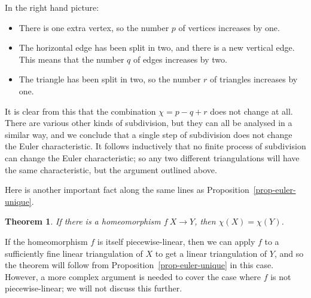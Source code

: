 \documentclass[reqno]{amsart}
\newtheorem{theorem}{Theorem}[section]
\theoremstyle{definition}
\begin{document}
\begin{center}
\end{center}

In the right hand picture:
\begin{itemize}
 \item There is one extra vertex, so the number $p$ of vertices
  increases by one.
 \item The horizontal edge has been split in two, and there is a new
  vertical edge.  This means that the number $q$ of edges increases by
  two.  
 \item The triangle has been split in two, so the number $r$ of
  triangles increases by one.
\end{itemize}
It is clear from this that the combination $\chi=p-q+r$ does not
change at all.  There are various other kinds of subdivision, but they
can all be analysed in a similar way, and we conclude that a single
step of subdivision does not change the Euler characteristic.  It
follows inductively that no finite process of subdivision can change
the Euler characteristic; so any two different triangulations will
have the same characteristic, but the argument outlined above. 

Here is another important fact along the same lines as
Proposition~\ref{prop-euler-unique}. 
\begin{theorem}\label{thm-euler-homeo}
 If there is a homeomorphism $f\:X\to Y$, then $\chi(X)=\chi(Y)$.
\end{theorem}
If the homeomorphism $f$ is itself piecewise-linear, then we can apply
$f$ to a sufficiently fine linear triangulation of $X$ to get a
linear triangulation of $Y$, and so the theorem will follow from
Proposition~\ref{prop-euler-unique} in this case.  However, a more
complex argument is needed to cover the case where $f$ is not
piecewise-linear; we will not discuss this further.
\end{document}
